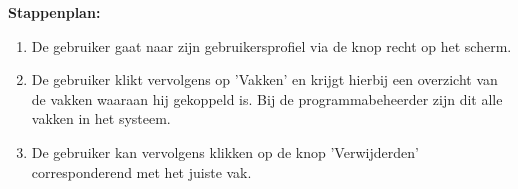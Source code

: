 \textbf{Stappenplan:}
	\begin{enumerate}
	\item De gebruiker gaat naar zijn gebruikersprofiel via de knop recht op het scherm.
	\item De gebruiker klikt vervolgens op 'Vakken' en krijgt hierbij een overzicht van de vakken waaraan hij gekoppeld is. Bij de programmabeheerder zijn dit alle vakken in het systeem.
	\item De gebruiker kan vervolgens klikken op de knop 'Verwijderden' corresponderend met het juiste vak.
	\end{enumerate}	    
        
\clearpage